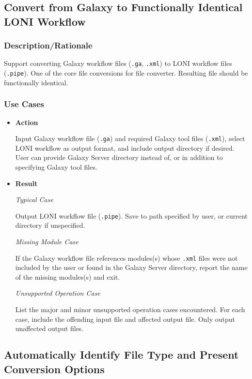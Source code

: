 \documentclass[12pt]{article}
\begin{document}
\subsection{Convert from Galaxy to Functionally Identical LONI Workflow}
\label{sec:galaxyloni}
\subsubsection{Description/Rationale} Support converting Galaxy workflow files (\texttt{.ga}, \texttt{.xml}) to LONI workflow files (\texttt{.pipe}). One of the core file conversions for file converter. Resulting file should be functionally identical.

\subsubsection{Use Cases}
\begin{itemize}
\item \textbf{Action}

Input Galaxy workflow file (\texttt{.ga}) and required Galaxy tool files (\texttt{.xml}), select LONI workflow as output format, and include output directory if desired. User can provide Galaxy Server directory instead of, or in addition to specifying Galaxy tool files.

\item \textbf{Result}

\textit{Typical Case}

Output LONI workflow file (\texttt{.pipe}). Save to path specified by user, or current directory if unspecified.


\textit{Missing Module Case}

If the Galaxy workflow file references modules(s) whose \texttt{.xml} files were not included by the user or found in the Galaxy Server directory, report the name of the missing modules(s) and exit.

\textit{Unsupported Operation Case}

List the major and minor unsupported operation cases encountered. For each case, include the offending input file and affected output file. Only output unaffected output files. 
\end{itemize}


\subsection{Automatically Identify File Type and Present Conversion Options}
\label{sec:auto}
\end{document}
